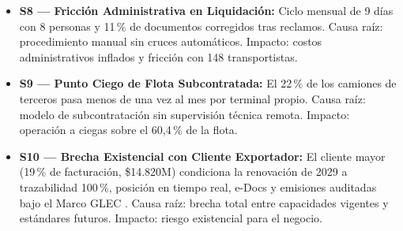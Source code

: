\begin{itemize}
    \item \textbf{S8 --- Fricción Administrativa en Liquidación:} Ciclo mensual de 9 días con 8 personas y 11\,\% de documentos corregidos tras reclamos. Causa raíz: procedimiento manual sin cruces automáticos. Impacto: costos administrativos inflados y fricción con 148 transportistas.
    \item \textbf{S9 --- Punto Ciego de Flota Subcontratada:} El 22\,\% de los camiones de terceros pasa menos de una vez al mes por terminal propio. Causa raíz: modelo de subcontratación sin supervisión técnica remota. Impacto: operación a ciegas sobre el 60,4\,\% de la flota.
    \item \textbf{S10 --- Brecha Existencial con Cliente Exportador:} El cliente mayor (19\,\% de facturación, \$14.820M) condiciona la renovación de 2029 a trazabilidad 100\,\%, posición en tiempo real, e-Docs y emisiones auditadas bajo el Marco GLEC \parencite{glec2023}. Causa raíz: brecha total entre capacidades vigentes y estándares futuros. Impacto: riesgo existencial para el negocio.
\end{itemize}

